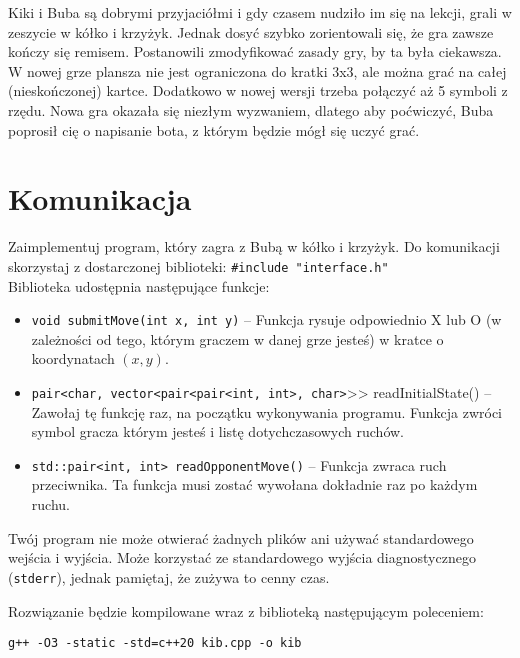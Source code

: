 \documentclass{spiral}
\begin{document}
\makeheader

Kiki i Buba są dobrymi przyjaciółmi i gdy czasem nudziło im się na lekcji,
grali w zeszycie w kółko i krzyżyk.
Jednak dosyć szybko zorientowali się, że gra zawsze kończy się remisem.
Postanowili zmodyfikować zasady gry, by ta była ciekawsza. W nowej grze plansza
nie jest ograniczona do kratki 3x3,
ale można grać na całej (nieskończonej) kartce. Dodatkowo w nowej wersji trzeba
połączyć aż 5 symboli z rzędu. Nowa gra okazała się niezłym wyzwaniem, dlatego
aby poćwiczyć, Buba poprosił
cię o napisanie bota, z którym będzie mógł się uczyć grać.

\section{Komunikacja}

\noindent Zaimplementuj program, który zagra z Bubą w kółko i krzyżyk. Do
komunikacji skorzystaj z dostarczonej biblioteki:
\texttt{\#include "interface.h"} \\

\noindent Biblioteka udostępnia następujące funkcje:
\begin{itemize}
	\item \texttt{void submitMove(int x, int y)} – Funkcja rysuje
	      odpowiednio X lub O (w zależności od tego, którym graczem w danej
	      grze jesteś)
	      w kratce o koordynatach $(x, y)$.

	\item \texttt{pair<char, vector<pair<pair<int, int>, char>}{>}{>
		      readInitialState()} – Zawołaj tę funkcję raz, na początku
	      wykonywania programu.
	      Funkcja zwróci symbol gracza którym jesteś i listę
	      dotychczasowych
	      ruchów.

	\item \texttt{std::pair<int, int> readOpponentMove()} – Funkcja zwraca
	      ruch przeciwnika. Ta funkcja musi zostać wywołana dokładnie raz
	      po każdym
	      ruchu.
\end{itemize}

\noindent Twój program nie może otwierać żadnych plików ani używać
standardowego wejścia i wyjścia.
Może korzystać ze standardowego wyjścia diagnostycznego (\texttt{stderr}),
jednak pamiętaj, że zużywa to cenny czas.

\noindent Rozwiązanie będzie kompilowane wraz z biblioteką następującym
poleceniem:
\begin{verbatim}
g++ -O3 -static -std=c++20 kib.cpp -o kib
\end{verbatim}
\end{document}
